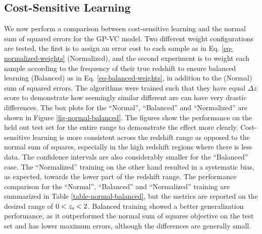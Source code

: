 \documentclass[useAMS,usenatbib,fleqn]{mn2e}
\begin{document}
\subsection{Cost-Sensitive Learning}

We now perform a comparison between cost-sensitive learning and the normal sum of squared errors for the GP-VC model. Two different weight configurations are tested, the first is to assign an error cost to each sample as in Eq. \eqref{eq-normalized-weights} (Normalized), and the second experiment is to weight each sample according to the frequency of their true redshift to ensure balanced learning (Balanced) as in Eq. \eqref{eq-balanced-weights}, in addition to the (Normal) sum of squared errors. The algorithms were trained such that they have equal $\Delta z$ score to demonstrate how seemingly similar different are can have very drastic differences. The box plots  for the ``Normal'', ``Balanced'' and ``Normalized'' are shown in Figure \ref{fig-normal-balanced}. The figures show the performance on the held out test set for the entire range to demonstrate the effect more clearly. Cost-sensitive learning is more consistent across the redshift range as opposed to the normal sum of squares, especially in the high redshift regions where there is less data. The confidence intervals are also considerably smaller for the ``Balanced'' case. The ``Normalized'' training on the other hand resulted in a systematic bias, as expected, towards the lower part of the redshift range. The performance comparison for the ``Normal'', ``Balanced'' and ``Normalized'' training are summarized in Table \ref{table-normal-balanced}, but the metrics are reported on the desired range of $0<z_{\rm s}<2$. Balanced training showed a better generalization performance, as it outperformed the normal sum of squares objective on the test set and has lower maximum errors, although the differences are generally small.
\end{document}
